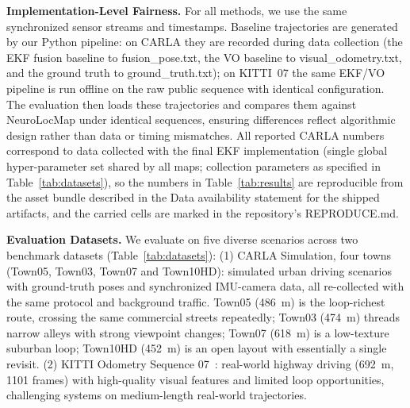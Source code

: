 \textbf{Implementation-Level Fairness.} For all methods, we use the same synchronized sensor streams and timestamps. Baseline trajectories are generated by our Python pipeline: on CARLA they are recorded during data collection (the EKF fusion baseline to fusion\_pose.txt, the VO baseline to visual\_odometry.txt, and the ground truth to ground\_truth.txt); on KITTI~07 the same EKF/VO pipeline is run offline on the raw public sequence with identical configuration. The evaluation then loads these trajectories and compares them against NeuroLocMap under identical sequences, ensuring differences reflect al\-go\-rith\-mic design rather than data or timing mismatches. All reported CARLA numbers correspond to data collected with the final EKF implementation (single global hyper-parameter set shared by all maps; collection parameters as specified in Table~\ref{tab:datasets}), so the numbers in Table~\ref{tab:results} are reproducible from the asset bundle described in the Data availability statement for the shipped artifacts, and the carried cells are marked in the repository's REPRODUCE.md.

\textbf{Evaluation Datasets.} We evaluate on five diverse scenarios across two benchmark datasets (Table~\ref{tab:datasets}): (1) CARLA Simulation, four towns (Town05, Town03, Town07 and Town10HD): simulated urban driving scenarios~\cite{dosovitskiy2017carla} with ground-truth poses and synchronized IMU-camera data, all re-collected with the same protocol and background traffic. Town05 (486~m) is the loop-richest route, crossing the same commercial streets repeatedly; Town03 (474~m) threads narrow alleys with strong viewpoint changes; Town07 (618~m) is a low-texture suburban loop; Town10HD (452~m) is an open layout with essentially a single revisit. (2) KITTI Odometry Sequence 07~\cite{geiger2012kitti}: real-world highway driving (692~m, 1101 frames) with high-quality visual features and limited loop opportunities, challenging systems on medium-length real-world trajectories.

